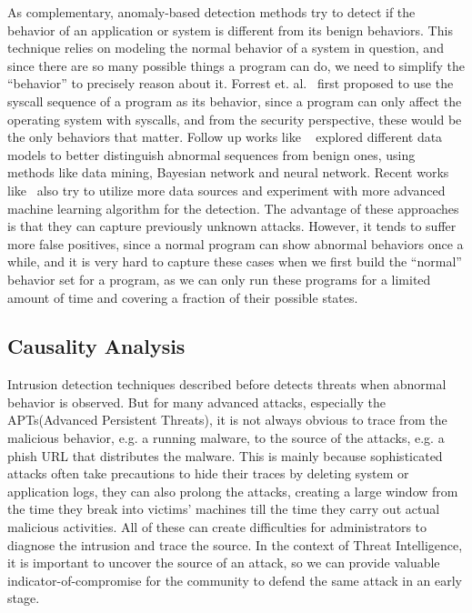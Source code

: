 As complementary, anomaly-based detection methods try to detect if
the behavior of an application or system is different from its benign
behaviors. This technique relies on modeling the normal behavior of a 
system in question, and since there are so many possible things a program 
can do, we need to simplify the ``behavior'' to precisely reason about 
it. Forrest et. al.~\cite{forrest1996sense} first proposed to use the
syscall sequence of a program as its behavior, since a program can only
affect the operating system with syscalls, and from the security 
perspective, these would be the only behaviors that matter. Follow up
works like ~\cite{lee1998data, warrender1999detecting, mutz2006anomalous}
explored different data models to better distinguish abnormal sequences
from benign ones, using methods like data mining, Bayesian network and 
neural network. Recent works like~\cite{du2017deeplog} also try to 
utilize more data sources and experiment with more advanced machine
learning algorithm for the detection. The advantage of these approaches 
is that they can capture previously unknown attacks. However, it tends
to suffer more false positives, since a normal program can show abnormal
behaviors once a while, and it is very hard to capture these
cases when we first build the ``normal'' behavior set for a program, as we 
can only run these programs for a limited amount of time and covering a 
fraction of their possible states.

\subsection{Causality Analysis}
Intrusion detection techniques described before detects threats 
when abnormal behavior is observed. But for many advanced 
attacks, especially the APTs(Advanced Persistent Threats), it 
is not always obvious to trace from the malicious behavior, e.g.
a running malware, to the source of the attacks, e.g. a phish 
URL that distributes the malware. This is mainly because sophisticated
attacks often take precautions to hide their traces by deleting
system or application logs, they can also prolong the attacks, 
creating a large window from the time they break into victims' 
machines till the time they carry out actual malicious activities. 
All of these can create difficulties for administrators to diagnose
the intrusion and trace the source. In the context of Threat 
Intelligence, it is important to uncover the source of 
an attack, so we can provide valuable indicator-of-compromise for the 
community to defend the same attack in an early stage.

